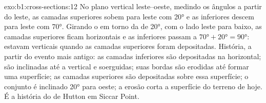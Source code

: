 \begin{solution}{exo:b1:cross-sections:12}
No plano vertical leste--oeste, medindo os ângulos a partir do leste, as camadas superiores sobem para leste com \ang{20} e as inferiores descem para leste com \ang{70}. Girando o  em torno da  de \ang{20}, com o lado leste para baixo, as camadas superiores ficam horizontais e as inferiores passam a $\ang{70} + \ang{20} = \ang{90}$: estavam verticais quando as camadas superiores foram depositadas. História, a partir do evento mais antigo: as camadas inferiores são depositadas na horizontal; são inclinadas até a vertical e soerguidas; suas bordas são erodidas até formar uma superfície; as camadas superiores são depositadas sobre essa superfície; o conjunto é inclinado \ang{20} para oeste; a erosão corta a superfície do terreno de hoje. É a história do  de Hutton em Siccar Point.
\end{solution}

